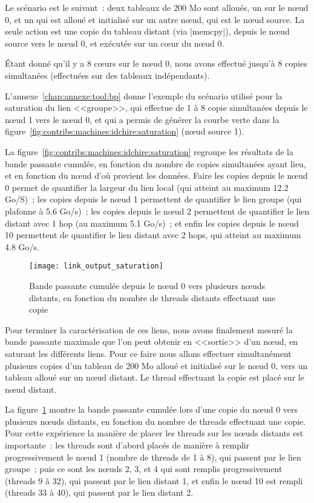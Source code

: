 Le scénario est le suivant~: deux tableaux de 200 Mo sont alloués, un sur le nœud 0, et un qui est alloué et initialisé sur un autre nœud, qui est le nœud source.
La seule action est une copie du tableau distant (via |memcpy|), depuis le nœud source vers le nœud 0, et exécutée sur un cœur du nœud 0.

Étant donné qu'il y a 8 cœurs sur le nœud 0, nous avons effectué jusqu'à 8 copies simultanées (effectuées sur des tableaux indépendants).

L'annexe~\ref{chap:annexe:tool:bp} donne l'exemple du scénario utilisé pour la saturation du lien <<groupe>>, qui effectue de 1 à 8 copie simultanées depuis le nœud 1 vers le nœud 0, et qui a permis de générer la courbe verte dans la figure~\ref{fig:contribs:machines:idchire:saturation} (nœud source 1).

La figure~\ref{fig:contribs:machines:idchire:saturation} regroupe les résultats de la bande passante cumulée, en fonction du nombre de copies simultanées ayant lieu, et en fonction du nœud d'où provient les données.
Faire les copies depuis le nœud 0 permet de quantifier la largeur du lien local (qui atteint au maximum 12.2 Go/S)~;
les copies depuis le nœud 1 permettent de quantifier le lien groupe (qui plafonne à 5.6 Go/s)~;
les copies depuis le nœud 2 permettent de quantifier le lien distant avec 1 hop (au maximum 5.1 Go/s)~;
et enfin les copies depuis le nœud 10 permettent de quantifier le lien distant avec 2 hops, qui atteint au maximum 4.8 Go/s.

\begin{figure}[ht]
  \centering
  \texttt{[image: link\_output\_saturation]}
  \caption{Bande passante cumulée depuis le nœud 0 vers plusieurs nœuds distants, en fonction du nombre de threads distants effectuant une copie}\label{fig:contribs:machines:idchire:saturation-output}
\end{figure}

Pour terminer la caractérisation de ces liens, nous avons finalement mesuré la bande passante maximale que l'on peut obtenir en <<sortie>> d'un nœud, en saturant les différents liens.
Pour ce faire nous allons effectuer simultanément plusieurs copies d'un tableau de 200 Mo alloué et initialisé sur le nœud 0, vers un tableau alloué sur un nœud distant. Le thread effectuant la copie est placé sur le nœud distant.

La figure~\ref{fig:contribs:machines:idchire:saturation-output} montre la bande passante cumulée lors d'une copie du nœud 0 vers plusieurs nœuds distants, en fonction du nombre de threads effectuant une copie.
Pour cette expérience la manière de placer les threads sur les nœuds distants est importante~: les threads sont d'abord placés de manière à remplir progressivement le nœud 1 (nombre de threads de 1 à 8), qui passent par le lien groupe~; puis ce sont les nœuds 2, 3, et 4 qui sont remplis progressivement (threads 9 à 32), qui passent par le lien distant 1, et enfin le nœud 10 est rempli (threads 33 à 40), qui passent par le lien distant 2.

